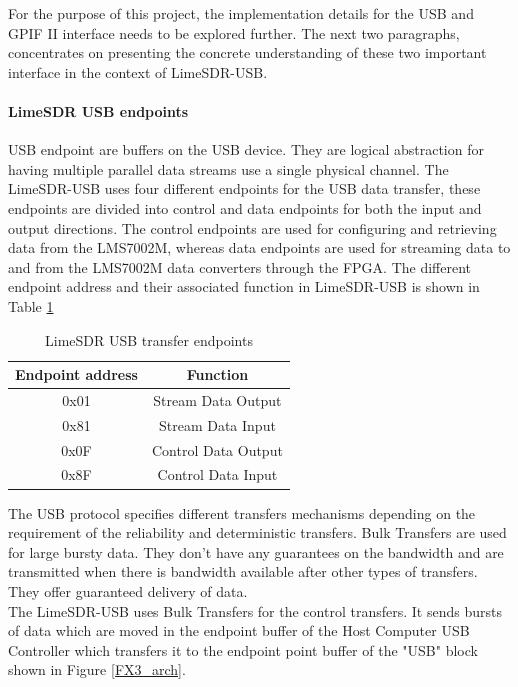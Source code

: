 For the purpose of this project, the implementation details for the USB and GPIF II interface needs to be explored further.
The next two paragraphs, concentrates on presenting the concrete understanding of these two important interface in the context of LimeSDR-USB.

\paragraph{LimeSDR USB endpoints}
\ac{USB} endpoint are buffers on the \ac{USB} device.
They are logical abstraction for having multiple parallel data streams use a single physical channel.
The LimeSDR-USB uses four different endpoints for the USB data transfer, these endpoints are divided into control and data endpoints for both the input and output directions.
The control endpoints are used for configuring and retrieving data from the LMS7002M, whereas data endpoints are used for streaming data to and from the LMS7002M data converters through the \ac{FPGA}.
The different endpoint address and their associated function in LimeSDR-USB is shown in Table \ref{Lime-USB_ep}\\

\begin{table}[h!]
\centering
\begin{tabular}{|c|c|}
\hline
Endpoint address & Function\\
\hline
0x01 & Stream Data Output\\
0x81 & Stream Data Input\\
0x0F & Control Data Output\\
0x8F & Control Data Input\\
\hline
\end{tabular}
\caption{LimeSDR USB transfer endpoints}
\label{Lime-USB_ep}
\end{table}

The \ac{USB} protocol specifies different transfers mechanisms depending on the requirement of the reliability and deterministic transfers.
Bulk Transfers are used for large bursty data.
They don't have any guarantees on the bandwidth and are transmitted when there is bandwidth available after other types of transfers.
They offer guaranteed delivery of data.\\

The LimeSDR-USB uses Bulk Transfers for the control transfers.
It sends bursts of data which are moved in the endpoint buffer of the Host Computer USB Controller which transfers it to the endpoint point buffer of the "USB" block shown in Figure \ref{FX3_arch}.\\

